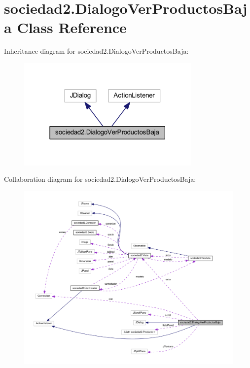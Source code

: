 \hypertarget{classsociedad2_1_1_dialogo_ver_productos_baja}{}\section{sociedad2.\+Dialogo\+Ver\+Productos\+Baja Class Reference}
\label{classsociedad2_1_1_dialogo_ver_productos_baja}


Inheritance diagram for sociedad2.\+Dialogo\+Ver\+Productos\+Baja\+:\nopagebreak
\begin{figure}[H]
\begin{center}
\leavevmode
\includegraphics[width=255pt]{classsociedad2_1_1_dialogo_ver_productos_baja__inherit__graph}
\end{center}
\end{figure}


Collaboration diagram for sociedad2.\+Dialogo\+Ver\+Productos\+Baja\+:
\nopagebreak
\begin{figure}[H]
\begin{center}
\leavevmode
\includegraphics[width=350pt]{classsociedad2_1_1_dialogo_ver_productos_baja__coll__graph}
\end{center}
\end{figure}
